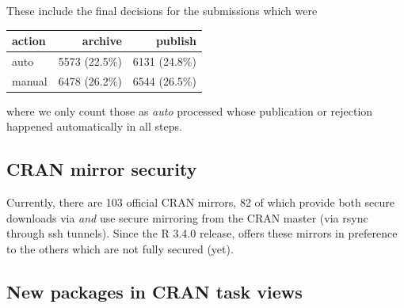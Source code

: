 These include the final decisions for the submissions which were
\begin{center}
\begin{tabular}{l|rr}
action & archive        & publish\\ \hline
auto   &   5573 (22.5\%)  & 6131 (24.8\%)\\
manual &   6478 (26.2\%)  & 6544 (26.5\%)
\end{tabular}
\end{center}
where we only count those as \emph{auto} processed whose publication or
rejection
happened automatically in all steps.


\subsection{CRAN mirror security}


Currently, there are 103 official CRAN mirrors, 82 of which provide both
secure downloads via  \emph{and} use secure mirroring from
the CRAN master (via rsync through ssh tunnels).  Since the R 3.4.0
release,  offers these mirrors in preference to
the others which are not fully secured (yet).

\subsection{New packages in CRAN task views}

